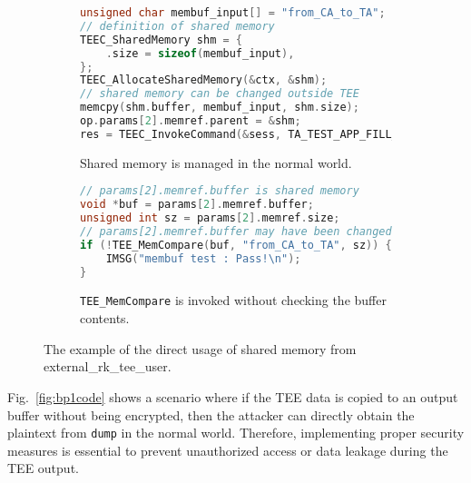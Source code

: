 \begin{figure}[t]
  \centering
  \begin{subfigure}[b]{\linewidth}
    \begin{lstlisting}[language=c++]
unsigned char membuf_input[] = "from_CA_to_TA";
// definition of shared memory
TEEC_SharedMemory shm = {
    .size = sizeof(membuf_input),
};
TEEC_AllocateSharedMemory(&ctx, &shm);
// shared memory can be changed outside TEE
memcpy(shm.buffer, membuf_input, shm.size);
op.params[2].memref.parent = &shm;
res = TEEC_InvokeCommand(&sess, TA_TEST_APP_FILL_MEM_BUF, &op, &err_origin);
    \end{lstlisting}
    \caption{Shared memory is managed in the normal world.}
  \end{subfigure}
  \hfill
  \begin{subfigure}[b]{\linewidth}
        \begin{lstlisting}[language=c++]
// params[2].memref.buffer is shared memory
void *buf = params[2].memref.buffer;
unsigned int sz = params[2].memref.size;
// params[2].memref.buffer may have been changed outside TEE
if (!TEE_MemCompare(buf, "from_CA_to_TA", sz)) {
    IMSG("membuf test : Pass!\n");
}
    \end{lstlisting}
    \caption{\texttt{TEE\_MemCompare} is invoked without checking the buffer contents.}
  \end{subfigure}
  \caption{The example of the direct usage of shared memory from external\_rk\_tee\_user.}
  \label{fig:bp3code}
\end{figure}

Fig.~\ref{fig:bp1code} shows a scenario where if the TEE data is copied to an output buffer without being encrypted, then the attacker can directly obtain the plaintext from \texttt{dump} in the normal world. Therefore, implementing proper security measures is essential to prevent unauthorized access or data leakage during the TEE output.

